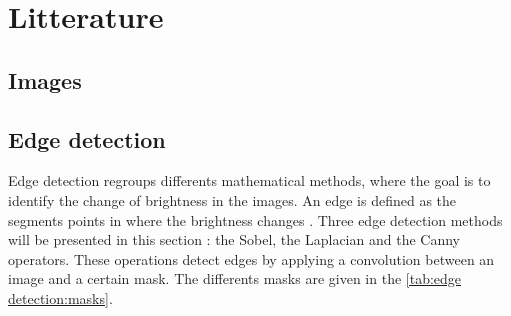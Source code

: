 \chapter{Litterature}


\section{Images}





\section{Edge detection}

Edge detection regroups differents mathematical methods, where the goal is to identify the change of brightness in the images. An edge is defined as the segments points in where the brightness changes \cite{bib:filter:wikipedia}. Three edge detection methods will be presented in this section : the Sobel, the Laplacian and the Canny operators. These operations detect edges by applying a convolution between an image and a certain mask. The differents masks are given in the \vref{tab:edge detection:masks}.


